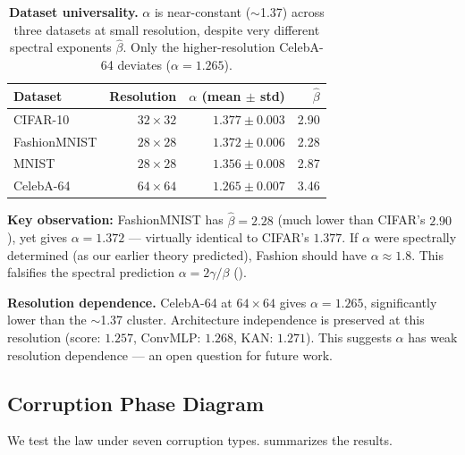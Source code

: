 \documentclass[letterpaper]{article}
\begin{document}
\begin{table}[t]
\centering\small
\begin{tabular}{lrrr}
\toprule
Dataset & Resolution & $\alpha$ (mean $\pm$ std) & $\hat\beta$ \\
\midrule
CIFAR-10     & $32\times32$ & $1.377 \pm 0.003$ & 2.90 \\
FashionMNIST & $28\times28$ & $1.372 \pm 0.006$ & 2.28 \\
MNIST        & $28\times28$ & $1.356 \pm 0.008$ & 2.87 \\
\midrule
CelebA-64    & $64\times64$ & $1.265 \pm 0.007$ & 3.46 \\
\bottomrule
\end{tabular}
\caption{\textbf{Dataset universality.}
$\alpha$ is near-constant ($\sim$1.37) across three datasets at
small resolution, despite very different spectral exponents $\hat\beta$.
Only the higher-resolution CelebA-64 deviates ($\alpha = 1.265$).}
\label{tab:datasets}
\end{table}

\textbf{Key observation:}
FashionMNIST has $\hat\beta = 2.28$ (much lower than CIFAR's $2.90$),
yet gives $\alpha = 1.372$ --- virtually identical to CIFAR's $1.377$.
If $\alpha$ were spectrally determined (as our earlier theory predicted),
Fashion should have $\alpha \approx 1.8$.
This falsifies the spectral prediction $\alpha = 2\gamma/\beta$
().

\textbf{Resolution dependence.}
CelebA-64 at $64\times64$ gives $\alpha = 1.265$, significantly lower
than the $\sim$1.37 cluster.
Architecture independence is preserved at this resolution
(score: $1.257$, ConvMLP: $1.268$, KAN: $1.271$).
This suggests $\alpha$ has weak resolution dependence ---
an open question for future work.

\subsection{Corruption Phase Diagram}
\label{sec:phase}

We test the law under seven corruption types.
 summarizes the results.
\end{document}
